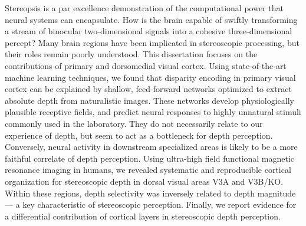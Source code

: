 


\begin{abstracts}        %

Stereopsis is a par excellence demonstration of the computational power that neural systems can encapsulate. How is the brain capable of swiftly transforming a stream of binocular two-dimensional signals into a cohesive three-dimensional percept? Many brain regions have been implicated in stereoscopic processing, but their roles remain poorly understood. This dissertation focuses on the contributions of primary and dorsomedial visual cortex. Using state-of-the-art machine learning techniques, we found that disparity encoding in primary visual cortex can be explained by shallow, feed-forward networks optimized to extract absolute depth from naturalistic images. These networks develop physiologically plausible receptive fields, and predict neural responses to highly unnatural stimuli commonly used in the laboratory. They do not necessarily relate to our experience of depth, but seem to act as a bottleneck for depth perception. Conversely, neural activity in downstream specialized areas is likely to be a more faithful correlate of depth perception. Using ultra-high field functional magnetic resonance imaging in humans, we revealed systematic and reproducible cortical organization for stereoscopic depth in dorsal visual areas V3A and V3B/KO. Within these regions, depth selectivity was inversely related to depth magnitude --- a key characteristic of stereoscopic perception. Finally, we report evidence for a differential contribution of cortical layers in stereoscopic depth perception.

\end{abstracts}




